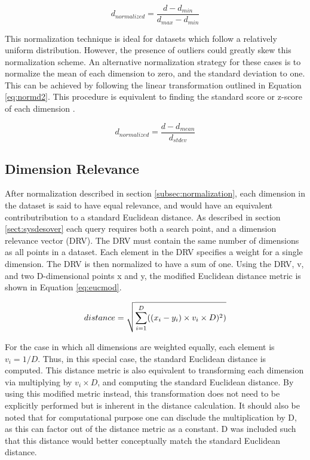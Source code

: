 \begin{equation}
\label{eq:normd}
d_{normalized} = \dfrac{d-d_{min}}{ d_{max} - d_{min} }
\end{equation}

This normalization technique is ideal for datasets which follow a relatively uniform distribution.  However, the presence of outliers could greatly skew this normalization scheme.  An alternative normalization strategy for these cases is to normalize the mean of each dimension to zero, and the standard deviation to one.  This can be achieved by following the linear transformation outlined in Equation \ref{eq:normd2}.  This procedure is equivalent to finding the standard score or z-score of each dimension \citep{cheadle2003analysis}.

\begin{equation}
\label{eq:normd2}
d_{normalized} = \dfrac{d-d_{mean}}{ d_{stdev} }
\end{equation}

\subsection{Dimension Relevance}
\label{subsec:dimrel}

After normalization described in section \ref{subsec:normalization}, each dimension in the dataset is said to have equal relevance, and would have an equivalent contributribution to a standard Euclidean distance.  As described in section \ref{sect:sysdesover} each query requires both a search point, and a dimension relevance vector (DRV).  The DRV must contain the same number of dimensions as all points in a dataset.  Each element in the DRV specifies a weight for a single dimension.  The DRV is then normalized to have a sum of one.  Using the DRV, v, and two D-dimensional points x and y, the modified Euclidean distance metric is shown in Equation \ref{eq:eucmod}.

\begin{equation}
\label{eq:eucmod}
distance = \sqrt{\sum\limits_{i=1}^D ((x_i - y_i) \times v_i \times D)^2)} \\
\end{equation}

For the case in which all dimensions are weighted equally, each element is $v_i=1/D$.  Thus, in this special case, the standard Euclidean distance is computed.  This distance metric is also equivalent to transforming each dimension via multiplying by $v_i \times D$, and computing the standard Euclidean distance.  By using this modified metric instead, this transformation does not need to be explicitly performed but is inherent in the distance calculation.  It should also be noted that for computational purpose one can disclude the multiplication by D, as this can factor out of the distance metric as a constant.  D was included such that this distance would better conceptually match the standard Euclidean distance.

